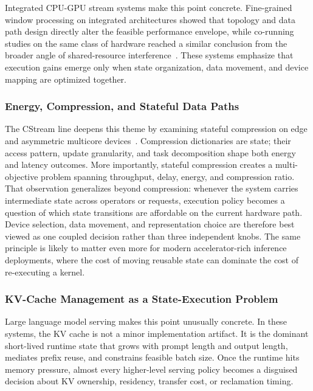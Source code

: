 \documentclass[acmsmall,screen,review]{acmart}
\begin{document}
Integrated CPU-GPU stream systems make this point concrete. Fine-grained window processing on integrated architectures showed that topology and data path design directly alter the feasible performance envelope, while co-running studies on the same class of hardware reached a similar conclusion from the broader angle of shared-resource interference~\cite{zhang2020finestream,zhang2016corun,zhang2016elastic}. These systems emphasize that execution gains emerge only when state organization, data movement, and device mapping are optimized together.

\subsubsection{Energy, Compression, and Stateful Data Paths}

The CStream line deepens this theme by examining stateful compression on edge and asymmetric multicore devices~\cite{zeng2023cstreamicde,zeng2024cstream}. Compression dictionaries are state; their access pattern, update granularity, and task decomposition shape both energy and latency outcomes. More importantly, stateful compression creates a multi-objective problem spanning throughput, delay, energy, and compression ratio. That observation generalizes beyond compression: whenever the system carries intermediate state across operators or requests, execution policy becomes a question of which state transitions are affordable on the current hardware path. Device selection, data movement, and representation choice are therefore best viewed as one coupled decision rather than three independent knobs. The same principle is likely to matter even more for modern accelerator-rich inference deployments, where the cost of moving reusable state can dominate the cost of re-executing a kernel.

\subsubsection{KV-Cache Management as a State-Execution Problem}

Large language model serving makes this point unusually concrete. In these systems, the KV cache is not a minor implementation artifact. It is the dominant short-lived runtime state that grows with prompt length and output length, mediates prefix reuse, and constrains feasible batch size. Once the runtime hits memory pressure, almost every higher-level serving policy becomes a disguised decision about KV ownership, residency, transfer cost, or reclamation timing.
\end{document}
